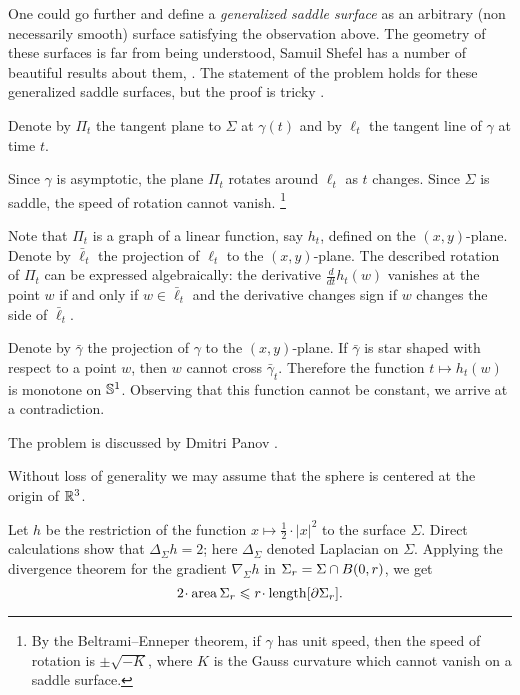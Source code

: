 One could go further and define a \emph{generalized saddle surface} as an arbitrary (non necessarily smooth) surface satisfying the observation above.
The geometry of these surfaces is far from being understood,
Samuil Shefel has a number of beautiful results about them, 
\cite[see][and the references therein]{shefel, AKP-invitation}.
The statement of the problem holds for these generalized saddle surfaces, but
the proof is tricky \cite{petrunin-stadler}.


Denote by $\Pi_t$ the tangent plane to $\Sigma$ at $\gamma(t)$ and by $\ell_t$ the tangent line of $\gamma$ at time $t$.

Since $\gamma$ is asymptotic, the plane $\Pi_t$ rotates around $\ell_t$ as $t$ changes.
Since $\Sigma$ is saddle, the speed of rotation cannot vanish.%
\footnote{By the Beltrami--Enneper theorem, if $\gamma$ has unit speed, then the speed of rotation is $\pm\sqrt{-K}$, where $K$ is the Gauss curvature which cannot vanish on a saddle surface.}

Note that $\Pi_t$ is a graph of a linear function, say $h_t$, defined on the $(x, y)$-plane.
Denote by $\bar\ell_t$ the projection of $\ell_t$ to the $(x, y)$-plane.
The described rotation of $\Pi_t$ can be expressed algebraically:
the derivative $\tfrac{d}{dt}h_t(w)$ vanishes at the point $w$ if and only if $w\in \bar\ell_t$ 
and the derivative changes sign if $w$ changes the side of $\bar\ell_t$.

Denote by $\bar\gamma$ the projection of $\gamma$ to the $(x, y)$-plane.
If $\bar\gamma$ is star shaped with respect to a point $w$, then $w$ cannot cross $\bar\gamma_t$.
Therefore the function $t\mapsto h_t(w)$ is monotone on $\mathbb{S}^1$.
Observing that this function cannot be constant, we arrive at a contradiction.\qeds

The problem is discussed by Dmitri Panov \cite{panov-curves}.

Without loss of generality we may assume that the sphere is centered at the origin of $\mathbb{R}^3$.

Let $h$ be the restriction of the function $x\mapsto \tfrac12\cdot|x|^2$ to the surface $\Sigma$.
Direct calculations show that $\Delta_\Sigma h =  2$;
here $\Delta_\Sigma$ denoted Laplacian on $\Sigma$.
Applying the divergence theorem for the gradient $\nabla_\Sigma h$
in $\Sigma_r\z=\Sigma\cap B(0,r)$, we get
\[2\cdot \area\Sigma_r\le r\cdot\length [\partial\Sigma_r].\]


